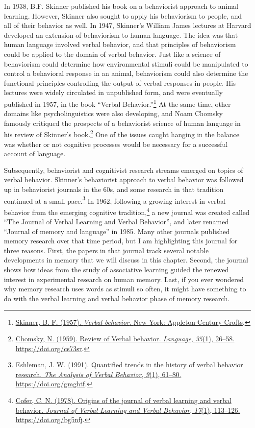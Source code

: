 \documentclass[
  oneside,
  12pt]{crumpbook}
\begin{document}
In 1938, B.F. Skinner published his book on a behaviorist approach to animal learning. However, Skinner also sought to apply his behaviorism to people, and all of their behavior as well. In 1947, Skinner's William James lectures at Harvard developed an extension of behaviorism to human language. The idea was that human language involved verbal behavior, and that principles of behaviorism could be applied to the domain of verbal behavior. Just like a science of behaviorism could determine how environmental stimuli could be manipulated to control a behavioral response in an animal, behaviorism could also determine the functional principles controlling the output of verbal responses in people. His lectures were widely circulated in unpublished form, and were eventually published in 1957, in the book ``Verbal Behavior.''\footnote{\protect\hyperlink{ref-skinnerVerbalBehavior1957}{Skinner, B. F. (1957). \emph{Verbal behavior}. {New York: Appleton-Century-Crofts}}.} At the same time, other domains like psycholinguistics were also developing, and Noam Chomsky famously critiqued the prospects of a behaviorist science of human language in his review of Skinner's book.\footnote{\protect\hyperlink{ref-chomskyReviewVerbalBehavior1959}{Chomsky, N. (1959). Review of {Verbal} behavior. \emph{Language}, \emph{35}(1), 26--58. \url{https://doi.org/cs73sr}}.} One of the issues caught hanging in the balance was whether or not cognitive processes would be necessary for a successful account of language.

Subsequently, behaviorist and cognitivist research streams emerged on topics of verbal behavior. Skinner's behaviorist approach to verbal behavior was followed up in behaviorist journals in the 60s, and some research in that tradition continued at a small pace.\footnote{\protect\hyperlink{ref-eshlemanQuantifiedTrendsHistory1991}{Eshleman, J. W. (1991). Quantified trends in the history of verbal behavior research. \emph{The Analysis of Verbal Behavior}, \emph{9}(1), 61--80. \url{https://doi.org/gmghtf}}.} In 1962, following a growing interest in verbal behavior from the emerging cognitive tradition,\footnote{\protect\hyperlink{ref-coferOriginsJournalVerbal1978}{Cofer, C. N. (1978). Origins of the journal of verbal learning and verbal behavior. \emph{Journal of Verbal Learning and Verbal Behavior}, \emph{17}(1), 113--126. \url{https://doi.org/bg5nfj}}.} a new journal was created called ``The Journal of Verbal Learning and Verbal Behavior'', and later renamed ``Journal of memory and language'' in 1985. Many other journals published memory research over that time period, but I am highlighting this journal for three reasons. First, the papers in that journal track several notable developments in memory that we will discuss in this chapter. Second, the journal shows how ideas from the study of associative learning guided the renewed interest in experimental research on human memory. Last, if you ever wondered why memory research uses words as stimuli so often, it might have something to do with the verbal learning and verbal behavior phase of memory research.
\end{document}
